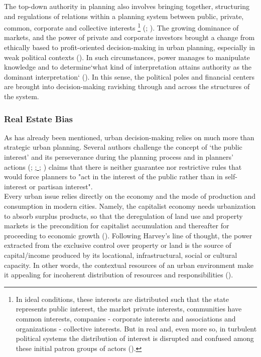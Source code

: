 \documentclass[11pt]{report}
\begin{document}
{{{The top-down authority in planning also involves bringing together, structuring and regulations of relations within a planning system between public, private, common, corporate and collective interests
\footnote{In ideal conditions, these interests are distributed such that the state represents public interest, the market private interests, communities have common interests, companies - corporate interests and associations and organizations - collective interests. But in real and, even more so, in turbulent political systems the distribution of interest is disrupted and confused among these initial patron groups of actors (\href{Vujosevic}{\citealt{vujosevic_regionalizam_2015}}).}
(\href{Maksic}{\citealt{maksic_european_2012}}; \href{Vujosevic}{\citealt{vujosevic_regionalizam_2015}}).
The growing dominance of markets, and the power of private and corporate investors brought a change from ethically based to profit-oriented decision-making in urban planning, especially in weak political contexts (\href{Lazarevic}{\citealt{bajec_rational_2009}}).
In such circumstances, power manages to manipulate knowledge and to determine`what kind of interpretation attains authority as the dominant interpretation` (\href{Getimis}{\citealt{getimis_comparing_2012}}).
In this sense, the political poles and financial centers are brought into decision-making ravishing through and across the structures of the system.

\subsubsection{Real Estate Bias}

As has already been mentioned, urban decision-making relies on much more than strategic urban planning.
Several authors challenge the concept of ‘the public interest’ and its perseverance during the planning process and in planners' actions
(\href{Alexander}{\citealt{alexander_XXX_2002}};
\href{Campbell}{{\citealt{campbel_XXX_2012}};
\href{Moroni}{\citealt{moroni_XXXX_2004}}};
\href{Sager}{\citealt{sager_logic_2006}})
\href{Sager}{\cite{sager_logic_2006}} claims that there is neither guarantee nor restrictive rules that would force planners to "act in the interest of the public rather than in self-interest or partisan interest".
\\

Every urban issue relies directly on the economy  and  the  mode  of  production  and  consumption  in  modern  cities.  Namely,  the  capitalist  economy  needs urbanization to absorb surplus products, so that the deregulation of land use and property markets is the precondition for capitalist accumulation and thereafter for proceeding to economic growth (\href{Harvey}{\citealt{harvey_rebel_2012}}).
Following Harvey’s line of thought, the power  extracted  from  the  exclusive  control  over  property  or  land  is  the  source  of  capital/income  produced  by  its  locational, infrastructural, social or cultural capacity.
In other words, the contextual resources of an urban environment make it appealing for incoherent distribution of resources and responsibilities (\href{Bolay}{\citealt{bolay_urban_2005}}).
\\

}}}
\end{document}
